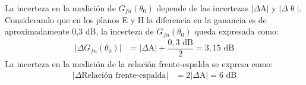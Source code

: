 La incerteza en la medición de $G_{fn}\left(\theta_0\right)$ depende de las incertezas $\left|\Delta\text{A}\right|$ y $\left|\Delta\uptheta\right|$. Considerando que en los planos E y H la diferencia en la ganancia es de aproximadamente 0,3 dB, la incerteza de $G_{fn}\left(\theta_0\right)$ queda expresada como:
\begin{align*}
\left|\Delta G_{fn}\left(\theta_0\right)\right| &= \left|\Delta\text{A}\right| + \dfrac{0,3 \text{ dB}}{2} = 3,15 \text{ dB}
\end{align*}
La incerteza en la medición de la relación frente-espalda se expresa como:
\begin{align*}
\left|\Delta\text{Relación frente-espalda}\right| &= 2\left|\Delta\text{A}\right| = 6 \text{ dB}
\end{align*}
